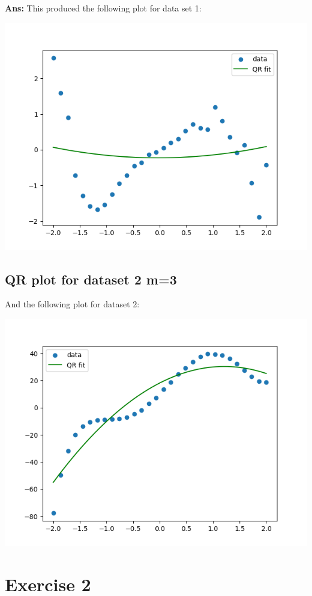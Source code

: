 \documentclass[11pt]{article}
\newenvironment{solbox}
  {\begin{mdframed}[linewidth=1pt,linecolor=black,roundcorner=5pt]
   \noindent\textbf{Ans: }\enspace}
  {\end{mdframed}}
\begin{document}
\begin{solbox}
    This produced the following plot for data set 1:

    \begin{center}
    \includegraphics[width=0.75\linewidth]{../Figures/M3QR_plot_dataset1.png}
    \end{center}

    \subsection{QR plot for dataset 2 m=3}
    
    And the following plot for dataset 2:
    \begin{center}
    \includegraphics[width=0.75\linewidth]{../Figures/M3QR_plot_dataset2.png}
    \end{center}


\end{solbox}


\section{Exercise 2}
\end{document}
